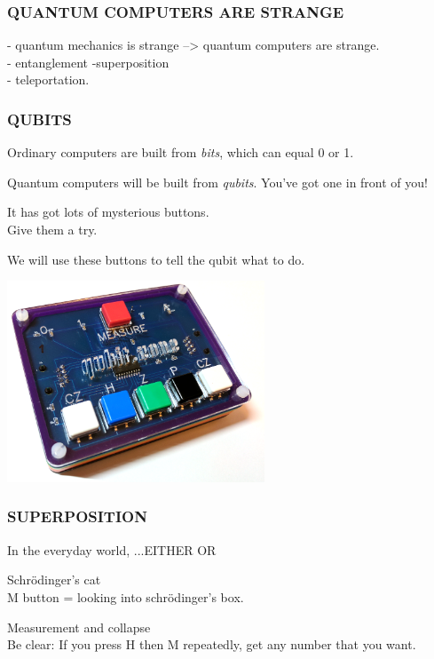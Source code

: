 \documentclass[aspectratio=169]{beamer}
\begin{document}
\newcommand\col[2]{\begin{minipage}{#1\textwidth}\raggedright #2\end{minipage}}


\begin{frame}
\frametitle{QUANTUM COMPUTERS ARE STRANGE}
- quantum mechanics is strange --> quantum computers are strange.\\
- entanglement
-superposition\\
- teleportation.
\end{frame}
\begin{frame}
\frametitle{QUBITS}
\vspace{25pt}
\col{0.5}{
Ordinary computers are built from \textit{bits}, which can equal 0 or 1.

\vspace{25pt}
Quantum computers will be built from \textit{qubits}. You've got one in front of you!

\vspace{25pt}
It has got lots of mysterious buttons.
\\
Give them a try.

\vspace{25pt}
We will use these buttons to tell the qubit what to do.
}
\col{0.4}{\includegraphics[height=6cm]{images/qubit_1.png}}

\end{frame}

\begin{frame}
\frametitle{SUPERPOSITION}

In the everyday world, ...EITHER OR

\vspace{20pt}
Schr\"odinger's cat\\

M button = looking into schr\"odinger's box.

Measurement and collapse\\

Be clear: If you press H then M repeatedly, get any number that you want.

\end{frame}
\end{document}
